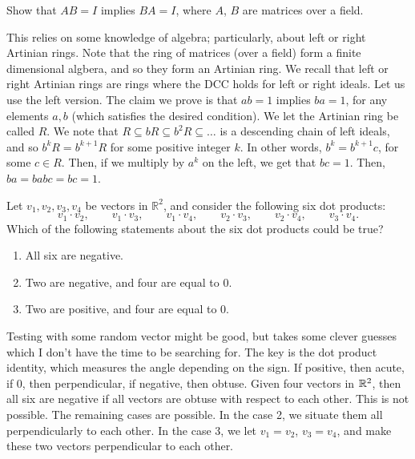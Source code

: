 \begin{proposition}
Show that $AB = I$ implies $BA = I$, where $A$, $B$ are matrices over a field.
\end{proposition}
\begin{solution}
This relies on some knowledge of algebra; particularly, about left or right Artinian rings. 
Note that the ring of matrices (over a field) form a finite dimensional algbera, and so
they form an Artinian ring. We recall that left or right Artinian rings are rings where
the DCC holds for left or right ideals. Let us  use the left version. 
The claim we prove is that $ab = 1$ implies $ba = 1$, for any elements $a,b$ 
(which satisfies the desired condition). We let the Artinian ring be called $R$. We note that
$R \subseteq bR \subseteq b^2R \subseteq \dots$ is a descending chain of left 
ideals, and so $b^k R = b^{k + 1}R$ for some positive integer $k$.
In other words, $b^k = b^{k + 1}c$, for some $c \in R$. Then, if we multiply by $a^k$ 
on the left, we get that $bc = 1$. Then, $ba = babc = bc = 1$.
\end{solution}

\begin{exercise}
Let $v_1, v_2, v_3, v_4$ be vectors in $\mathbb{R}^2$, and consider the following six dot products:
\[
v_1 \cdot v_2,\qquad
v_1\cdot v_3,\qquad
v_1\cdot v_4,\qquad
v_2\cdot v_3,\qquad
v_2\cdot v_4,\qquad
v_3\cdot v_4.
\]
Which of the following statements about the six dot products could be true?
\begin{enumerate}
    \item All six are negative.
    \item Two are negative, and four are equal to $0$.
    \item Two are positive, and four are equal to $0$.
\end{enumerate}
\end{exercise}
\begin{solution}
Testing with some random vector might be good, but takes some clever guesses
which I don't have the time to be searching for. The key is the dot product 
identity, which measures the angle depending on the sign. If positive, then acute,
if $0$, then perpendicular, if negative, then obtuse. Given four vectors 
in $\mathbb{R}^2$, then all six are negative if all vectors are obtuse with respect to each 
other. This is not possible. The remaining cases are possible.
In the case 2, we situate them all perpendicularly to each other. In the case 3,
we let $v_1 = v_2$, $v_3 = v_4$, and make these two vectors perpendicular to each other.
\end{solution}

